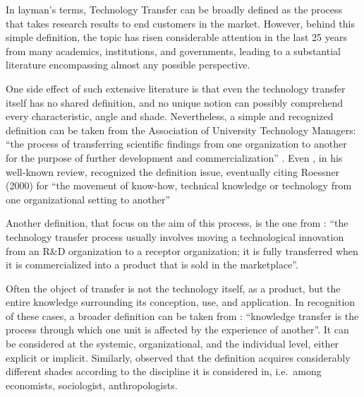 

\label{Chapter1} %


In layman's terms, Technology Transfer can be broadly defined as the process that takes research results to end customers in the market. However, behind this simple definition, the topic has risen considerable attention in the last 25 years from many academics, institutions, and governments, leading to a substantial literature encompassing almost any possible perspective.

One side effect of such extensive literature is that even the technology transfer itself has no shared definition, and no unique notion can possibly comprehend every characteristic, angle and shade. Nevertheless, a simple and recognized definition can be taken from the Association of University Technology Managers: \enquote{the process of transferring scientific findings from one organization to another for the purpose of further development and commercialization} \citep{Genshaft2016}. Even \citet{Bozeman2000}, in his well-known review, recognized the definition issue, eventually citing Roessner (2000) for \enquote{the movement of know-how, technical knowledge or technology from one organizational setting to another}

Another definition, that focus on the aim of this process, is the one from \citet{Rogers2001}: \enquote{the technology transfer process usually involves moving a technological innovation from an R\&D organization to a receptor organization; it is fully transferred when it is commercialized into a product that is sold in the marketplace}. 

Often the object of transfer is not the technology itself, as a product, but the entire knowledge surrounding its conception, use, and application. In recognition of these cases, a broader definition can be taken from \citet{Argote2000}: \enquote{knowledge transfer is the process through which one unit is affected by the experience of another}. It can be considered at the systemic, organizational, and the individual level, either explicit or implicit. Similarly, \citet{Zhao1992} observed that the definition acquires considerably different shades according to the discipline it is considered in, i.e.\ among economists, sociologist, anthropologists. 

